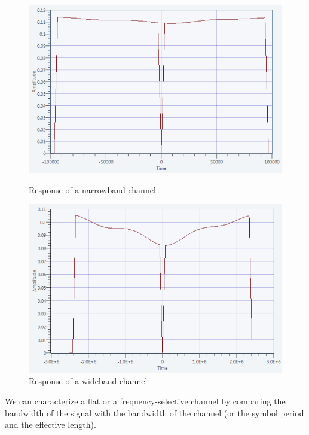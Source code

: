 \documentclass[frenchb, oneside, headings=normal]{scrartcl}
\begin{document}
\begin{figure}[!ht]
    \begin{minipage}[b]{0.48\linewidth}
        \centering \includegraphics[scale=0.45]{img/channel_response_narrow.png}
     \caption{Response of a narrowband channel}
     \label{fig2}
    \end{minipage}\hfill
    \begin{minipage}[b]{0.48\linewidth}
         \centering \includegraphics[scale=0.45]{img/channel_response_wideband.png}
 \caption{Response of a wideband channel}\label{fig3}
    \end{minipage}
\end{figure}

We can characterize a flat or a frequency-selective channel by comparing the bandwidth of the signal with the bandwidth of the channel (or the symbol period and the effective length).\\
\end{document}
